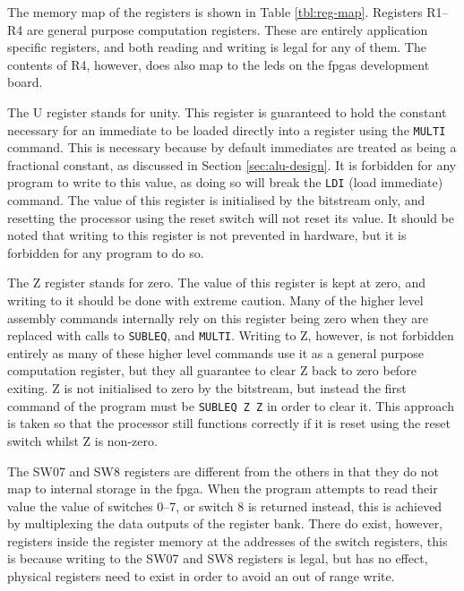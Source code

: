 The memory map of the registers is shown in Table \ref{tbl:reg-map}. Registers R1--R4 are general purpose computation registers. These are entirely application specific registers, and both reading and writing is legal for any of them. The contents of R4, however, does also map to the \glspl{led} on the \glspl{fpga} development board.

The U register stands for unity. This register is guaranteed to hold the constant necessary for an immediate to be loaded directly into a register using the \texttt{MULTI} command. This is necessary because by default immediates are treated as being a fractional constant, as discussed in Section \ref{sec:alu-design}. It is forbidden for any program to write to this value, as doing so will break the \texttt{LDI} (load immediate) command. The value of this register is initialised by the bitstream only, and resetting the processor using the reset switch will not reset its value. It should be noted that writing to this register is not prevented in hardware, but it is forbidden for any program to do so.

The Z register stands for zero. The value of this register is kept at zero, and writing to it should be done with extreme caution. Many of the higher level assembly commands internally rely on this register being zero when they are replaced with calls to \texttt{SUBLEQ}, and \texttt{MULTI}. Writing to Z, however, is not forbidden entirely as many of these higher level commands use it as a general purpose computation register, but they all guarantee to clear Z back to zero before exiting. Z is not initialised to zero by the bitstream, but instead the first command of the program must be \texttt{SUBLEQ Z Z} in order to clear it. This approach is taken so that the processor still functions correctly if it is reset using the reset switch whilst Z is non-zero.

The SW07 and SW8 registers are different from the others in that they do not map to internal storage in the \gls{fpga}. When the program attempts to read their value the value of switches 0--7, or switch 8 is returned instead, this is achieved by multiplexing the data outputs of the register bank. There do exist, however, registers inside the register memory at the addresses of the switch registers, this is because writing to the SW07 and SW8 registers is legal, but has no effect, physical registers need to exist in order to avoid an out of range write.


